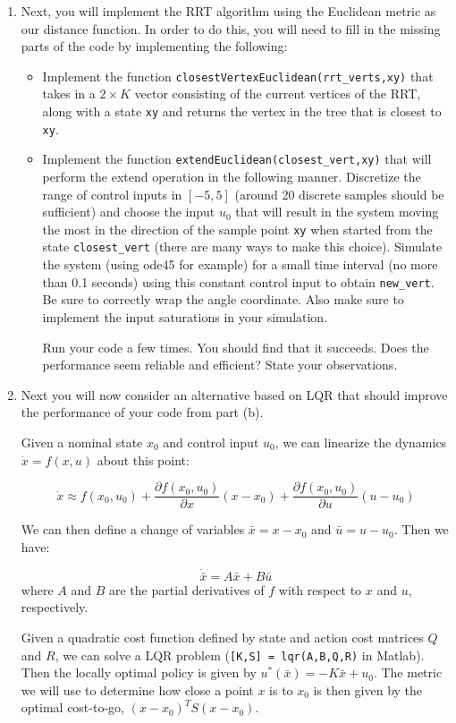 \documentclass[11pt,letterpaper]{article}
\begin{document}
\begin{enumerate}
\begin{enumerate}
\item Next, you will implement the RRT algorithm using the Euclidean metric as our distance function. In order to do this, you will need to fill in the missing parts of the code by implementing the following:

\begin{itemize}
\item Implement the function {\tt closestVertexEuclidean(rrt\_verts,xy)} that takes in a $2\times K$ vector consisting of the current vertices of the RRT, along with a state {\tt xy} and returns the vertex in the tree that is closest to {\tt xy}.
 
\item Implement the function {\tt extendEuclidean(closest\_vert,xy)} that will perform the extend operation in the following manner. Discretize the range of control inputs in $[-5,5]$ (around 20 discrete samples should be sufficient) and choose the input $u_0$ that will result in the system moving the most in the direction of the sample point {\tt xy} when started from the state {\tt closest\_vert} (there are many ways to make this choice). Simulate the system (using ode45 for example) for a small time interval (no more than 0.1 seconds) using this constant control input to obtain {\tt new\_vert}. Be sure to correctly wrap the angle coordinate. Also make sure to implement the input saturations in your simulation.

	Run your code a few times. You should find that it succeeds. Does the performance seem reliable and efficient? State your observations. 
\end{itemize}

\item Next you will now consider an alternative based on LQR that should improve the performance of your code from part (b).

Given a nominal state $x_0$ and control input $u_0$, we can linearize the dynamics $\dot{x} = f(x,u)$ about this point:

\[ \dot{x} \approx f(x_0,u_0) + \frac{\partial f(x_0,u_0)}{\partial x} (x-x_0)+ \frac{\partial f(x_0,u_0)}{\partial u} (u-u_0)  \]

We can then define a change of variables $\bar{x} = x-x_0$ and $\bar{u} = u-u_0$. Then we have:

\[ \dot{\bar{x}} =  A\bar{x} + B\bar{u}\]
where $A$ and $B$ are the partial derivatives of $f$ with respect to $x$ and $u$, respectively. 

Given a quadratic cost function defined by state and action cost matrices $Q$ and $R$, we can solve a LQR problem ({\tt [K,S] = lqr(A,B,Q,R)} in Matlab). Then the locally optimal policy is given by $u^*(\bar{x})=-K\bar{x} + u_0$. The metric we will use to determine how close a point $x$ is to $x_0$ is then given by the optimal cost-to-go, $(x-x_0)^T S (x-x_0)$. 


\end{enumerate}
\end{enumerate}
\end{document}
